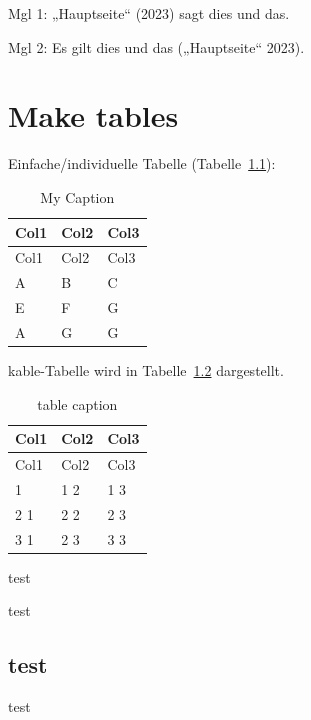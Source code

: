 \documentclass[
  11pt,
]{scrbook}
\begin{document}
Mgl 1: {„Hauptseite``} (2023) sagt dies und das.

Mgl 2: Es gilt dies und das ({„Hauptseite``} 2023).

\hypertarget{make-tables}{%
\chapter{Make tables}\label{make-tables}}

Einfache/individuelle Tabelle (Tabelle~\ref{tbl-letters}):

\hypertarget{tbl-letters}{}
\begin{longtable}[]{@{}lll@{}}
\caption{\label{tbl-letters}My Caption}\tabularnewline
\toprule\noalign{}
Col1 & Col2 & Col3 \\
\midrule\noalign{}
\endfirsthead
\toprule\noalign{}
Col1 & Col2 & Col3 \\
\midrule\noalign{}
\endhead
\bottomrule\noalign{}
\endlastfoot
A & B & C \\
E & F & G \\
A & G & G \\
\end{longtable}

\newpage{}

kable-Tabelle wird in Tabelle~\ref{tbl-example_table} dargestellt.

\hypertarget{tbl-example_table}{}
\begin{longtable}[]{@{}lll@{}}
\caption{\label{tbl-example_table}table caption}\tabularnewline
\toprule\noalign{}
Col1 & Col2 & Col3 \\
\midrule\noalign{}
\endfirsthead
\toprule\noalign{}
Col1 & Col2 & Col3 \\
\midrule\noalign{}
\endhead
\bottomrule\noalign{}
\endlastfoot
1 1 & 1 2 & 1 3 \\
2 1 & 2 2 & 2 3 \\
3 1 & 2 3 & 3 3 \\
\end{longtable}

\newpage{}

test

\newpage{}

test

\newpage{}

\hypertarget{test}{%
\section{test}\label{test}}

test
\end{document}
